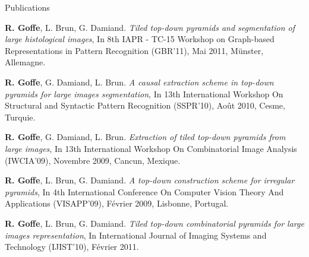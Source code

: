 \begin{rubric}{Publications}
  

  \textbf{R. Goffe}, L. Brun, G. Damiand.
  \textit{Tiled top-down pyramids and segmentation of large histological images}, 
  In 8th IAPR - TC-15 Workshop on Graph-based Representations in Pattern Recognition (GBR'11),
  Mai 2011, Münster, Allemagne.

  \textbf{R. Goffe}, G. Damiand, L. Brun.
  \textit{A causal extraction scheme in top-down pyramids for large images segmentation}, 
  In 13th International Workshop On Structural and Syntactic Pattern Recognition (SSPR'10), 
  Août 2010, Cesme, Turquie.

  \textbf{R. Goffe}, G. Damiand, L. Brun.
  \textit{Extraction of tiled top-down pyramids from large images}, 
  In 13th International Workshop On Combinatorial Image Analysis (IWCIA'09), 
  Novembre 2009, Cancun, Mexique.

  \textbf{R. Goffe}, L. Brun, G. Damiand.
  \textit{A top-down construction scheme for irregular pyramids}, 
  In 4th International Conference On Computer Vision Theory And Applications (VISAPP'09), 
  Février 2009, Lisbonne, Portugal.
  

  \textbf{R. Goffe}, L. Brun, G. Damiand.
  \textit{Tiled top-down combinatorial pyramids for large images representation}, 
  In International Journal of Imaging Systems and Technology (IJIST'10), 
  Février 2011.

\end{rubric}
